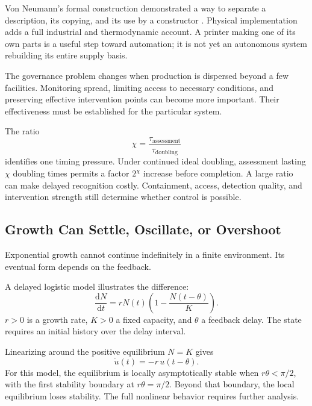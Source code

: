 Von Neumann's formal construction demonstrated a way to separate a description, its copying, and its use by a constructor \cite{vonneumann1966theory}. Physical implementation adds a full industrial and thermodynamic account. A printer making one of its own parts is a useful step toward automation; it is not yet an autonomous system rebuilding its entire supply basis.

The governance problem changes when production is dispersed beyond a few facilities. Monitoring spread, limiting access to necessary conditions, and preserving effective intervention points can become more important. Their effectiveness must be established for the particular system.

The ratio
\begin{equation}
 \chi=\frac{\tau_{\mathrm{assessment}}}
            {\tau_{\mathrm{doubling}}}
\end{equation}
identifies one timing pressure. Under continued ideal doubling, assessment lasting $\chi$ doubling times permits a factor $2^\chi$ increase before completion. A large ratio can make delayed recognition costly. Containment, access, detection quality, and intervention strength still determine whether control is possible.

\subsection{Growth Can Settle, Oscillate, or Overshoot}

Exponential growth cannot continue indefinitely in a finite environment. Its eventual form depends on the feedback.

A delayed logistic model illustrates the difference:
\begin{equation}
 \frac{\mathrm dN}{\mathrm dt}
 =rN(t)\left(1-\frac{N(t-\theta)}{K}\right).
\end{equation}
$r>0$ is a growth rate, $K>0$ a fixed capacity, and $\theta$ a feedback delay. The state requires an initial history over the delay interval.

Linearizing around the positive equilibrium $N=K$ gives
\begin{equation}
 \dot u(t)=-r\,u(t-\theta).
\end{equation}
For this model, the equilibrium is locally asymptotically stable when $r\theta<\pi/2$, with the first stability boundary at $r\theta=\pi/2$. Beyond that boundary, the local equilibrium loses stability. The full nonlinear behavior requires further analysis.


